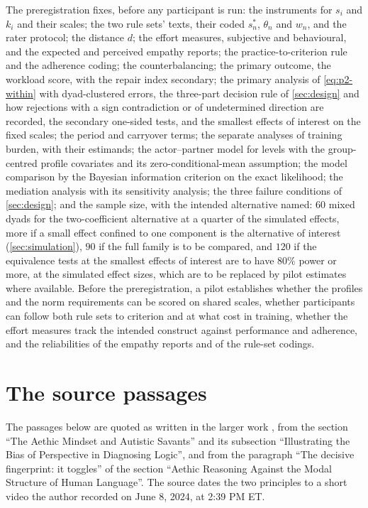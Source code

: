 The preregistration fixes, before any participant is run: the instruments for $s_i$ and $k_i$ and their scales; the two rule sets' texts, their coded $s^{*}_n$, $\theta_n$ and $w_n$, and the rater protocol; the distance $d$; the effort measures, subjective and behavioural, and the expected and perceived empathy reports; the practice-to-criterion rule and the adherence coding; the counterbalancing; the primary outcome, the workload score, with the repair index secondary; the primary analysis of \eqref{eq:p2-within} with dyad-clustered errors, the three-part decision rule of \autoref{sec:design} and how rejections with a sign contradiction or of undetermined direction are recorded, the secondary one-sided tests, and the smallest effects of interest on the fixed scales; the period and carryover terms; the separate analyses of training burden, with their estimands; the actor--partner model for levels with the group-centred profile covariates and its zero-conditional-mean assumption; the model comparison by the Bayesian information criterion on the exact likelihood; the mediation analysis with its sensitivity analysis; the three failure conditions of \autoref{sec:design}; and the sample size, with the intended alternative named: $60$ mixed dyads for the two-coefficient alternative at a quarter of the simulated effects, more if a small effect confined to one component is the alternative of interest (\autoref{sec:simulation}), $90$ if the full family is to be compared, and $120$ if the equivalence tests at the smallest effects of interest are to have $80\%$ power or more, at the simulated effect sizes, which are to be replaced by pilot estimates where available. Before the preregistration, a pilot establishes whether the profiles and the norm requirements can be scored on shared scales, whether participants can follow both rule sets to criterion and at what cost in training, whether the effort measures track the intended construct against performance and adherence, and the reliabilities of the empathy reports and of the rule-set codings.


\section{The source passages}
\label{app:source}

The passages below are quoted as written in the larger work \cite{Aethus}, from the section ``The Aethic Mindset and Autistic Savants'' and its subsection ``Illustrating the Bias of Perspective in Diagnosing Logic'', and from the paragraph ``The decisive fingerprint: it toggles'' of the section ``Aethic Reasoning Against the Modal Structure of Human Language''. The source dates the two principles to a short video the author recorded on June 8, 2024, at 2:39 PM ET.

